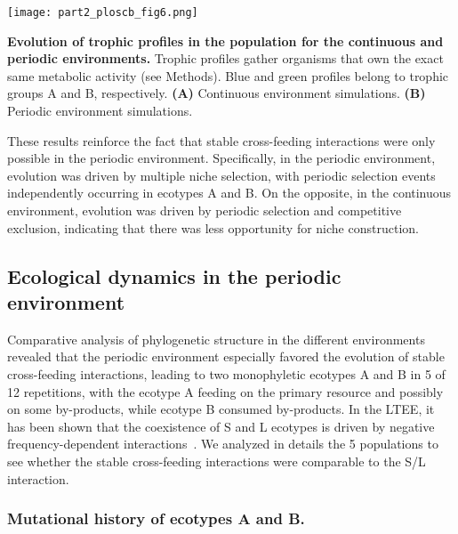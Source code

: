 \newpage
\begin{figurehere}
\centering
\texttt{[image: part2\_ploscb\_fig6.png]}
\caption[Evolution of trophic profiles in the population for the continuous and periodic environments.]{{\bf Evolution of trophic profiles in the population for the continuous and periodic environments.} Trophic profiles gather organisms that own the exact same metabolic activity (see Methods). Blue and green profiles belong to trophic groups A and B, respectively. {\bf (A)} Continuous environment simulations. {\bf (B)} Periodic environment simulations.}
\label{fig:part2:first_result:Fig6}
\end{figurehere}

These results reinforce the fact that stable cross-feeding interactions were only possible in the periodic environment. Specifically, in the periodic environment, evolution was driven by multiple niche selection, with periodic selection events independently occurring in ecotypes A and B. On the opposite, in the continuous environment, evolution was driven by periodic selection and competitive exclusion, indicating that there was less opportunity for niche construction.


\subsection*{Ecological dynamics in the periodic environment}

Comparative analysis of phylogenetic structure in the different environments revealed that the periodic environment especially favored the evolution of stable cross-feeding interactions, leading to two monophyletic ecotypes A and B in 5 of 12 repetitions, with the ecotype A feeding on the primary resource and possibly on some by-products, while ecotype B consumed by-products.
In the LTEE, it has been shown that the coexistence of S and L ecotypes is driven by negative frequency-dependent interactions~\citep{rozen-et-al-2005,rozen-et-al-2009}. We analyzed in details the 5 populations to see whether the stable cross-feeding interactions were comparable to the S/L interaction.


\subsubsection*{Mutational history of ecotypes A and B.}

